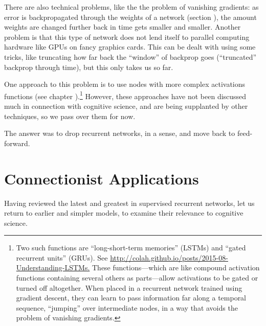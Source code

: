There are also technical problems, like the the problem of vanishing gradients: as error is backpropagated through the weights of a network (section ), the amount weights are changed further back in time gets smaller and smaller. Another problem is that this type of network does not lend itself to parallel computing hardware like GPUs on fancy graphics cards. This can be dealt with using some tricks, like truncating how far back the ``window'' of backprop goes (``truncated'' backprop through time), but this only takes us so far.

One approach to this problem is to use nodes with more complex activations functions (see chapter ).\footnote{Two such functions are ``long-short-term memories'' (LSTMs)  \cite{schmidhuber1997long, olah2015understanding} and ``gated recurrent units'' (GRUs). See \url{http://colah.github.io/posts/2015-08-Understanding-LSTMs.} These functions---which are like compound activation functions containing several others as parts---allow activations to be gated or turned off altogether. When placed in a recurrent network trained using gradient descent, they can learn to pass information far along a temporal sequence, ``jumping'' over intermediate nodes, in a way that avoids the problem of vanishing gradients.\label{lstm}} However, these approaches have not been discussed much in connection with cognitive science, and are being supplanted by other techniques, so we pass over them for now. 


The answer was to drop recurrent networks, in a sense, and move back to feed-forward.

\section{Connectionist Applications}\label{internalRepsRecurrent}

Having reviewed the latest and greatest in supervised recurrent networks, let us return to earlier and simpler models, to examine their relevance to cognitive science.


